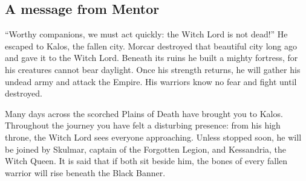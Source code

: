 \subsection*{A message from Mentor}
``Worthy companions, we must act quickly: the Witch Lord is not dead!'' He escaped to Kalos, the fallen city. Morcar destroyed that beautiful city long ago and gave it to the Witch Lord. Beneath its ruins he built a mighty fortress, for his creatures cannot bear daylight. Once his strength returns, he will gather his undead army and attack the Empire. His warriors know no fear and fight until destroyed.

Many days across the scorched Plains of Death have brought you to Kalos. Throughout the journey you have felt a disturbing presence: from his high throne, the Witch Lord sees everyone approaching. Unless stopped soon, he will be joined by Skulmar, captain of the Forgotten Legion, and Kessandria, the Witch Queen. It is said that if both sit beside him, the bones of every fallen warrior will rise beneath the Black Banner.
